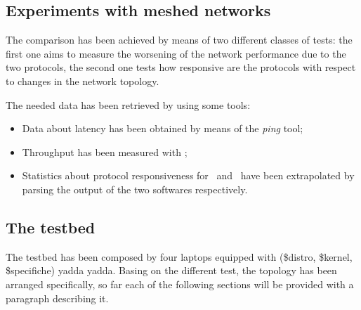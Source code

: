 \subsection{Experiments with meshed networks}

    The comparison has been achieved by means of two different classes
    of tests: the first one aims to measure the worsening of the network
    performance due to the two protocols, the second one tests how
    responsive are the protocols with respect to changes in the
    network topology.

    The needed data has been retrieved by using some tools:
    \begin{itemize}
    \item   Data about latency has been obtained by means of the
            \emph{ping} tool;
    \item   Throughput has been measured with
            \netperf\cite{bib:NetPerf};
    \item   Statistics about protocol responsiveness for \batman\ and
            \olsr\ have been extrapolated by parsing the output of the
            two softwares respectively.
    \end{itemize}

\subsection{The testbed}

    The testbed has been composed by four laptops equipped with
    (\$distro, \$kernel, \$specifiche) yadda yadda. Basing on the
    different test, the topology has been arranged specifically, so
    far each of the following sections will be provided with a
    paragraph describing it.
